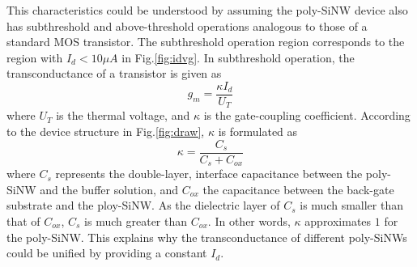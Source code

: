 \documentclass{article}
\begin{document}
This characteristics could be understood by assuming the poly-SiNW device also
has subthreshold and above-threshold operations analogous to those of a standard MOS transistor.
The subthreshold operation region corresponds to the region with $I_d < 10\mu A$ in Fig.\ref{fig:idvg}.
In subthreshold operation, the transconductance of a transistor is given as
%
\begin{equation}
  g_m = \frac{\kappa I_{d}}{U_T}
\end{equation}
%
where $U_T$ is the thermal voltage, and
$\kappa$ is the gate-coupling coefficient.
According to the device structure in Fig.\ref{fig:draw},
$\kappa$ is formulated as
%
\begin{equation}
  \kappa=\frac{C_s}{C_s+C_{ox}}
\end{equation}
%
where $C_s$ represents the double-layer, interface capacitance between the poly-SiNW and the buffer solution,
and $C_{ox}$ the capacitance between the back-gate substrate and the ploy-SiNW.
As the dielectric layer of $C_s$ is much smaller than that of $C_{ox}$,
$C_s$ is much greater than $C_{ox}$. In other words, $\kappa$  approximates $1$ for the poly-SiNW.
This explains why the transconductance of different poly-SiNWs could be unified by providing a constant $I_d$.
%


%
\end{document}
